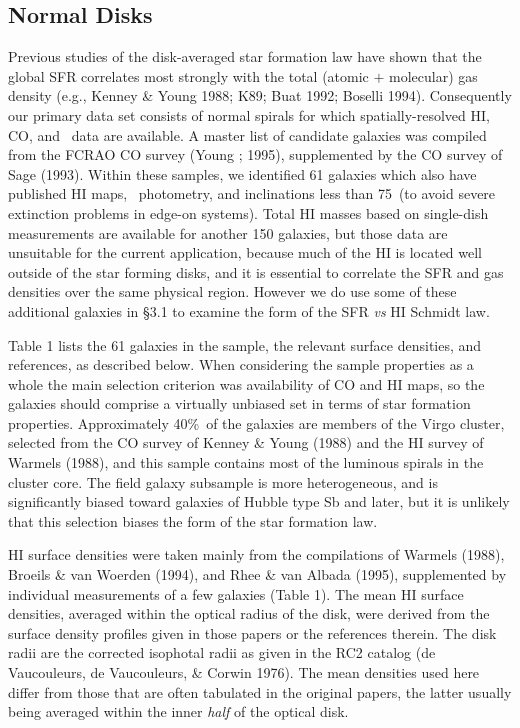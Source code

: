 \subsection{Normal Disks}

Previous studies of the disk-averaged star formation law have shown that 
the global SFR correlates most strongly with the total (atomic $+$ 
molecular) gas density (e.g., Kenney \& Young 1988; K89; Buat 1992; 
Boselli 1994).  Consequently our primary data set consists of normal 
spirals for which spatially-resolved HI, CO, and \halpha\ data are 
available.  A master list of candidate galaxies was compiled from the
FCRAO CO survey (Young ; 1995), supplemented by the CO survey of Sage 
(1993).  Within these samples, we identified 61 galaxies which also have 
published HI maps, \halpha\ photometry, and inclinations less than  
75\arcdeg\ (to avoid severe extinction problems in edge-on systems).  
Total HI masses based on single-dish measurements are available for 
another 150 galaxies, but those data are unsuitable for the current 
application, because much of the HI is located well outside of the star 
forming disks, and it is essential to correlate the SFR and gas densities 
over the same physical region.  However we do use some of these additional
galaxies in \S3.1 to examine the form of the SFR {\it vs} HI Schmidt
law.

Table 1 lists the 61 galaxies in the 
sample, the relevant surface densities, and references, as 
described below.  When considering the sample properties as a whole
the main selection criterion was availability of CO and HI maps,
so the galaxies should comprise a virtually unbiased set in terms
of star formation properties.  Approximately 40\%\ of the galaxies
are members of the Virgo cluster, selected from the CO survey
of Kenney \& Young (1988) and the HI survey of Warmels (1988), and
this sample contains most of the luminous spirals in the cluster core.
The field galaxy subsample is more heterogeneous, and is significantly
biased toward galaxies of Hubble type Sb and later, but it is unlikely
that this selection biases the form of the star formation law.

HI surface densities were taken mainly from the compilations of Warmels (1988), 
Broeils \& van Woerden (1994), and Rhee \& van Albada (1995), supplemented by   
individual measurements of a few galaxies (Table 1).  The mean HI surface
densities, averaged within the optical radius of the disk, were
derived from the surface density profiles 
given in those papers or the references therein.  The disk radii 
are the corrected isophotal radii as given in the RC2 catalog 
(de Vaucouleurs, de Vaucouleurs, \& Corwin 1976).  The mean densities
used here differ from those that are often tabulated in the original
papers, the latter usually being
averaged within the inner {\it half} of the optical disk.  

